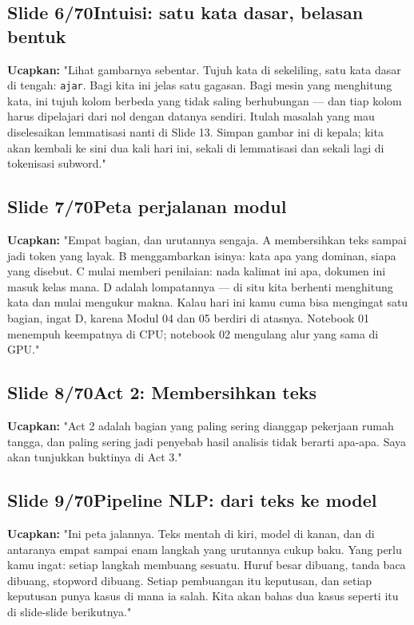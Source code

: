 \documentclass[11pt]{article}
\renewcommand{\framebox}[1]{\colorbox{acc!15}{\textcolor{acc}{\textbf{#1}}}}
\begin{document}
\subsection*{\framebox{Slide 6/70}\quad Intuisi: satu kata dasar, belasan bentuk}
\textbf{Ucapkan:} "Lihat gambarnya sebentar. Tujuh kata di sekeliling, satu kata dasar di tengah: \texttt{ajar}. Bagi kita ini jelas satu gagasan. Bagi mesin yang menghitung kata, ini tujuh kolom berbeda yang tidak saling berhubungan — dan tiap kolom harus dipelajari dari nol dengan datanya sendiri. Itulah masalah yang mau diselesaikan lemmatisasi nanti di Slide 13. Simpan gambar ini di kepala; kita akan kembali ke sini dua kali hari ini, sekali di lemmatisasi dan sekali lagi di tokenisasi subword."\\[2pt]

\subsection*{\framebox{Slide 7/70}\quad Peta perjalanan modul}
\textbf{Ucapkan:} "Empat bagian, dan urutannya sengaja. A membersihkan teks sampai jadi token yang layak. B menggambarkan isinya: kata apa yang dominan, siapa yang disebut. C mulai memberi penilaian: nada kalimat ini apa, dokumen ini masuk kelas mana. D adalah lompatannya — di situ kita berhenti menghitung kata dan mulai mengukur makna. Kalau hari ini kamu cuma bisa mengingat satu bagian, ingat D, karena Modul 04 dan 05 berdiri di atasnya. Notebook 01 menempuh keempatnya di CPU; notebook 02 mengulang alur yang sama di GPU."\\[2pt]

\subsection*{\framebox{Slide 8/70}\quad Act 2: Membersihkan teks}
\textbf{Ucapkan:} "Act 2 adalah bagian yang paling sering dianggap pekerjaan rumah tangga, dan paling sering jadi penyebab hasil analisis tidak berarti apa-apa. Saya akan tunjukkan buktinya di Act 3."\\[2pt]

\subsection*{\framebox{Slide 9/70}\quad Pipeline NLP: dari teks ke model}
\textbf{Ucapkan:} "Ini peta jalannya. Teks mentah di kiri, model di kanan, dan di antaranya empat sampai enam langkah yang urutannya cukup baku. Yang perlu kamu ingat: setiap langkah membuang sesuatu. Huruf besar dibuang, tanda baca dibuang, stopword dibuang. Setiap pembuangan itu keputusan, dan setiap keputusan punya kasus di mana ia salah. Kita akan bahas dua kasus seperti itu di slide-slide berikutnya."\\[2pt]
\end{document}
